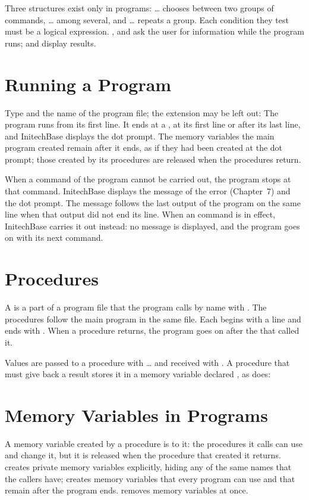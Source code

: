Three structures exist only in programs:  \ldots{} 
chooses between two groups of commands,  \ldots{} 
among several, and  \ldots{}  repeats a group.  Each
condition they test must be a logical expression.  , 
and  ask the user for information while the program runs; 
and  display results.

\section{Running a Program}
Type  and the name of the program file; the extension  may
be left out:
The program runs from its first line.  It ends at a , at its first
 line or after its last line, and InitechBase displays the dot
prompt.  The memory variables the main program created remain after it ends,
as if they had been created at the dot prompt; those created by its
procedures are released when the procedures return.

When a command of the program cannot be carried out, the program stops at
that command.  InitechBase displays the message of the error (Chapter~7) and
the dot prompt.  The message follows the last output of the program on the
same line when that output did not end its line.  When an 
command is in effect, InitechBase carries it out instead: no message is
displayed, and the program goes on with its next command.

\section{Procedures}
A  is a part of a program file that the program calls by name
with .  The procedures follow the main program in the same file.  Each
begins with a  line and ends with .  When a
procedure returns, the program goes on after the  that called it.

Values are passed to a procedure with  \ldots{}  and received
with .  A procedure that must give back a result stores it in a
memory variable declared , as  does:

\section{Memory Variables in Programs}
A memory variable created by a procedure is  to it: the
procedures it calls can use and change it, but it is released when the
procedure that created it returns.   creates private
memory variables explicitly, hiding any of the same names that the callers
have;  creates memory variables that every program can use and
that remain after the program ends.   removes memory variables at
once.

